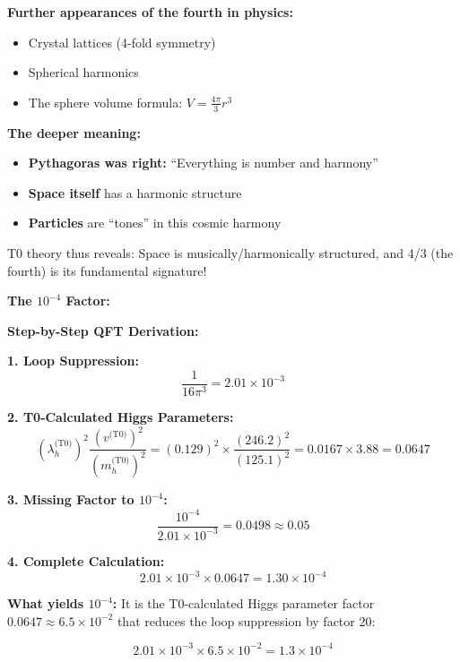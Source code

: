 \textbf{Further appearances of the fourth in physics:}
\begin{itemize}
	\item Crystal lattices (4-fold symmetry)
	\item Spherical harmonics
	\item The sphere volume formula: $V = \frac{4\pi}{3}r^3$
\end{itemize}

\textbf{The deeper meaning:}
\begin{itemize}
	\item \textbf{Pythagoras was right:} ``Everything is number and harmony''
	\item \textbf{Space itself} has a harmonic structure
	\item \textbf{Particles} are ``tones'' in this cosmic harmony
\end{itemize}

T0 theory thus reveals: Space is musically/harmonically structured, and 4/3 (the fourth) is its fundamental signature!

\textbf{The $10^{-4}$ Factor:}

\textbf{Step-by-Step QFT Derivation:}

\textbf{1. Loop Suppression:}
\begin{equation}
	\frac{1}{16\pi^3} = 2.01 \times 10^{-3}
\end{equation}

\textbf{2. T0-Calculated Higgs Parameters:}
\begin{equation}
	(\lambda_h^{\text{(T0)}})^2 \frac{(v^{\text{(T0)}})^2}{(m_h^{\text{(T0)}})^2} = (0.129)^2 \times \frac{(246.2)^2}{(125.1)^2} = 0.0167 \times 3.88 = 0.0647
\end{equation}

\textbf{3. Missing Factor to $10^{-4}$:}
\begin{equation}
	\frac{10^{-4}}{2.01 \times 10^{-3}} = 0.0498 \approx 0.05
\end{equation}

\textbf{4. Complete Calculation:}
\begin{equation}
	2.01 \times 10^{-3} \times 0.0647 = 1.30 \times 10^{-4}
\end{equation}

\textbf{What yields $10^{-4}$:}
It is the T0-calculated Higgs parameter factor $0.0647 \approx 6.5 \times 10^{-2}$ that reduces the loop suppression by factor 20:

\begin{equation}
	2.01 \times 10^{-3} \times 6.5 \times 10^{-2} = 1.3 \times 10^{-4}
\end{equation}

